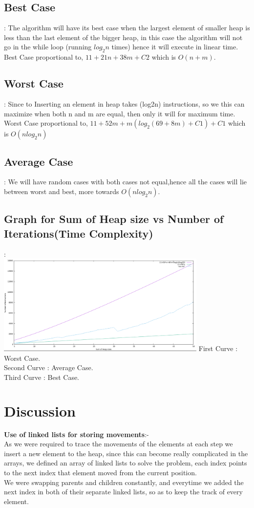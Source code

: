 \documentclass[conference]{IEEEtran}
\begin{document}
\subsection{\textbf{Best Case}} : 	
The algorithm will have its best case when the largest element of smaller heap is less than the last element of the bigger heap, in this case the algorithm will not go in the while loop (running $log_2n$ times) hence it will execute in linear time.
Best Case proportional to,
		$11 + 21n + 38m + C2$  which is  $O(n + m)$.
        
\subsection{\textbf{Worst Case}} : 
Since to Inserting an element in heap takes (log2n) instructions, so we this can maximize when both n and m are equal, then only it will for maximum time.
	Worst Case proportional to,
		$11 + 52m + m(log_{2}(69 + 8m) + C1)  + C1$ which is  $O(nlog_{2}n)$

\subsection{\textbf{Average Case}} : 
We will have random cases with both cases not equal,hence all the cases will lie between worst and best, more towards $O(nlog_{2}n)$. 

\subsection{\textbf{Graph for Sum of Heap size vs Number of Iterations(Time Complexity)}} :\\
\includegraphics[height =  5.0cm,width = \linewidth]{time__1_.png}
First Curve : Worst Case.\\
Second Curve : Average Case.\\
Third Curve : Best Case.

\section{\textbf{Discussion}}
\textbf{Use of linked lists for storing movements}:-\\
As we were required to trace the movements of the elements at each step we insert a new element to the heap, since this can become really complicated in the arrays, we defined an array of linked lists to solve the problem, each index points to the next index that element moved from the current position.\\
We were swapping parents and children constantly, and everytime we added the next index in both of their separate linked lists, so as to keep the track of every element.\\
\end{document}
